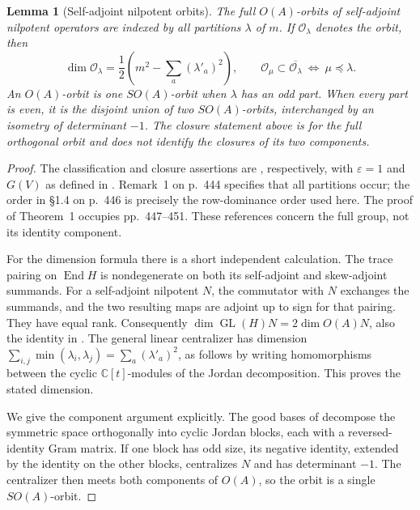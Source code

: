 \documentclass[11pt,reqno]{amsart}
\numberwithin{equation}{section}
\newtheorem{lemma}[theorem]{Lemma}
\theoremstyle{definition}\newtheorem{definition}[theorem]{Definition}
\theoremstyle{remark}\newtheorem{remark}[theorem]{Remark}
\newcommand{\C}{\mathbb C}\newcommand{\Q}{\mathbb Q}
\DeclareMathOperator{\End}{End}
\begin{document}
\begin{lemma}[Self-adjoint nilpotent orbits]
\label{lem:orthogonal-orbits-v145}
The full \(O(A)\)-orbits of self-adjoint nilpotent operators are
indexed by all partitions \(\lambda\) of \(m\).  If
\(\mathcal O_\lambda\) denotes the orbit, then
\[
 \dim\mathcal O_\lambda=
       \frac12\left(m^2-\sum_a(\lambda'_a)^2\right),\qquad
 \mathcal O_\mu\subset\overline{\mathcal O_\lambda}
       \ \Longleftrightarrow\ \mu\preceq\lambda.
\]
An \(O(A)\)-orbit is one \(SO(A)\)-orbit when \(\lambda\)
has an odd part.  When every part is even, it is the disjoint union
of two \(SO(A)\)-orbits, interchanged by an isometry of determinant
\(-1\).  The closure statement above is for the full orthogonal
orbit and does not identify the closures of its two components.
\end{lemma}
\begin{proof}
The classification and closure assertions are
\cite[Proposition~1, p.~444; Theorem~1, p.~447]{Ohta1986}, respectively,
with \(\varepsilon=1\) and \(G(V)\) as defined in
\cite[\S1.1, p.~443]{Ohta1986}.  Remark~1 on p.~444 specifies that
all partitions occur; the order in \S1.4 on p.~446 is precisely the
row-dominance order used here.  The proof of Theorem~1 occupies
pp.~447--451.  These references concern the full group, not its
identity component.

For the dimension formula there is a short independent calculation.
The trace pairing on \(\End H\) is nondegenerate on both its
self-adjoint and skew-adjoint summands.  For a self-adjoint nilpotent
\(N\), the commutator with \(N\) exchanges the summands, and the
two resulting maps are adjoint up to sign for that pairing.  They
have equal rank.  Consequently
\(\dim\operatorname{GL}(H)N=2\dim O(A)N\), also the identity
in \cite[\S2.4, Remark~8(i), p.~456]{Ohta1986}.
The general linear centralizer has dimension
\(\sum_{i,j}\min(\lambda_i,\lambda_j)
=\sum_a(\lambda'_a)^2\), as follows by writing homomorphisms
between the cyclic \(\C[t]\)-modules of the Jordan decomposition.
This proves the stated dimension.

We give the component argument explicitly.  The good bases of
\cite[Lemma~1, p.~444]{Ohta1986} decompose the symmetric space
orthogonally into cyclic Jordan blocks, each with a reversed-identity
Gram matrix.  If one block has odd size, its negative identity,
extended by the identity on the other blocks, centralizes \(N\)
and has determinant \(-1\).  The centralizer then meets both
components of \(O(A)\), so the orbit is a single \(SO(A)\)-orbit.


\end{proof}
\end{document}
